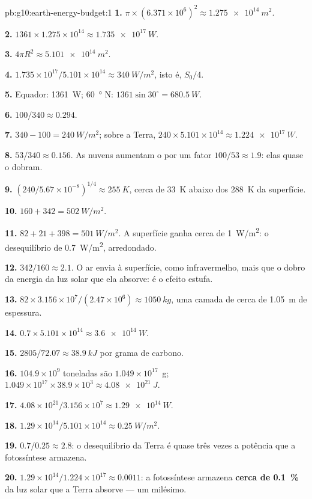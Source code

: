 \begin{solution}{pb:g10:earth-energy-budget:1}
\textbf{1.} $\pi \times (6.371\times10^6)^2 \approx \qty{1.275e14}{m^2}$.

\textbf{2.} $1361 \times 1.275\times10^{14} \approx \qty{1.735e17}{W}$.

\textbf{3.} $4\pi R^2 \approx \qty{5.101e14}{m^2}$.

\textbf{4.} $1.735\times10^{17}/5.101\times10^{14} \approx \qty{340}{W/m^2}$,
isto é, $S_0/4$.

\textbf{5.} Equador: \qty{1361}{W}; \qty{60}{\degree} N: $1361 \sin
30^\circ = \qty{680.5}{W}$.

\textbf{6.} $100/340 \approx 0.294$.

\textbf{7.} $340 - 100 = \qty{240}{W/m^2}$; sobre a Terra, $240 \times
5.101\times10^{14} \approx \qty{1.224e17}{W}$.

\textbf{8.} $53/340 \approx 0.156$. As nuvens aumentam o  por um fator
$100/53 \approx 1.9$: elas quase o dobram.

\textbf{9.} $(240/5.67\times10^{-8})^{1/4} \approx \qty{255}{K}$, cerca de
\qty{33}{K} abaixo dos \qty{288}{K} da superfície.

\textbf{10.} $160 + 342 = \qty{502}{W/m^2}$.

\textbf{11.} $82 + 21 + 398 = \qty{501}{W/m^2}$. A superfície ganha cerca de
\qty{1}{W/m^2}: o desequilíbrio de \qty{0.7}{W/m^2}, arredondado.

\textbf{12.} $342/160 \approx 2.1$. O ar envia à superfície, como
infravermelho, mais que o dobro da energia da luz solar que ela absorve: é
o efeito estufa.

\textbf{13.} $82 \times 3.156\times10^7/(2.47\times10^6) \approx
\qty{1050}{kg}$, uma camada de cerca de \qty{1.05}{m} de espessura.

\textbf{14.} $0.7 \times 5.101\times10^{14} \approx \qty{3.6e14}{W}$.

\textbf{15.} $2805/72.07 \approx \qty{38.9}{kJ}$ por grama de carbono.

\textbf{16.} $104.9\times10^9$ toneladas são $1.049\times10^{17}$~g;
$1.049\times10^{17} \times 38.9\times10^3 \approx \qty{4.08e21}{J}$.

\textbf{17.} $4.08\times10^{21}/3.156\times10^7 \approx \qty{1.29e14}{W}$.

\textbf{18.} $1.29\times10^{14}/5.101\times10^{14} \approx
\qty{0.25}{W/m^2}$.

\textbf{19.} $0.7/0.25 \approx 2.8$: o desequilíbrio da Terra é quase três
vezes a potência que a fotossíntese armazena.

\textbf{20.} $1.29\times10^{14}/1.224\times10^{17} \approx 0.0011$: a
fotossíntese armazena \textbf{cerca de \qty{0.1}{\percent}} da luz solar que
a Terra absorve --- um milésimo.
\end{solution}
